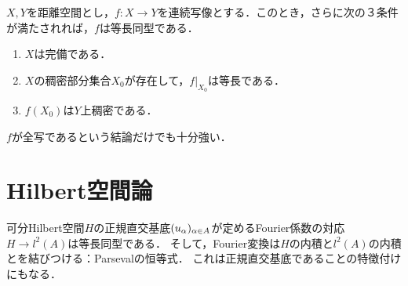 \documentclass[uplatex,dvipdfmx]{jsreport}
\begin{document}
\begin{lemma}[連続延長が等長同型であり続けるための条件]\label{lemma-continuous-extension-of-isometry}
    $X,Y$を距離空間とし，$f:X\to Y$を連続写像とする．このとき，さらに次の３条件が満たされれば，$f$は等長同型である．
    \begin{enumerate}
        \item $X$は完備である．
        \item $X$の稠密部分集合$X_0$が存在して，$f|_{X_0}$は等長である．
        \item $f(X_0)$は$Y$上稠密である．
    \end{enumerate}
\end{lemma}
\begin{remark}
    $f$が全写であるという結論だけでも十分強い．
\end{remark}

\section{Hilbert空間論}

\begin{tcolorbox}[colframe=ForestGreen, colback=ForestGreen!10!white,breakable,colbacktitle=ForestGreen!40!white,coltitle=black,fonttitle=\bfseries\sffamily,
title=]
    可分Hilbert空間$H$の正規直交基底$(u_\alpha)_{\alpha\in A}$が定めるFourier係数の対応$H\to l^2(A)$は等長同型である．
    そして，Fourier変換は$H$の内積と$l^2(A)$の内積とを結びつける：Parsevalの恒等式．
    これは正規直交基底であることの特徴付けにもなる．
\end{tcolorbox}
\end{document}
